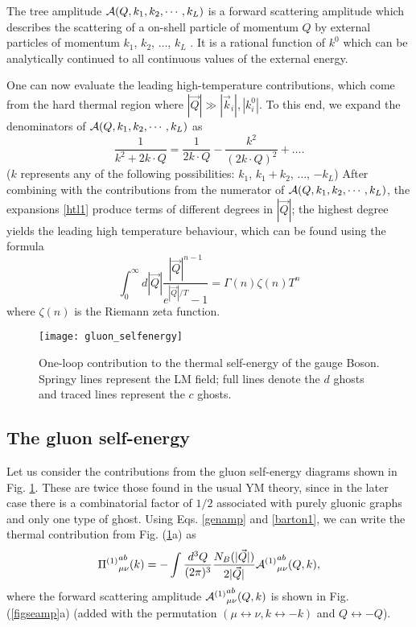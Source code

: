 \documentclass[longbibliography,groupedaddress,showpacs,showkeys,amssymb,eqsecnum,aps,nofootinbib,superscriptaddress]{revtex4}
\newcommand{\be}{\begin{equation}}
\newcommand{\ee}{\end{equation}}
\begin{document}
The tree amplitude ${\cal A}(Q,k_1,k_2,\cdots,k_L)$ is a forward 
scattering amplitude which describes the scattering of a
on-shell particle of momentum $Q$ by external particles of momentum
$k_1$, $k_2$, $\dots$, $k_L$ \cite{Barton:1990fk}. It is
a rational function of $k^0$
which can be analytically continued to all continuous values of the
external energy.

One can now evaluate the leading  high-temperature contributions,  
which come from the hard thermal region where 
$|\vec Q|\gg |\vec k_i|,|k^0_i|$. To this end,  we expand the
denominators of ${\cal A}(Q,k_1,k_2,\cdots,k_L)$ as
\be\label{htl1}
\frac{1}{k^2 + 2 k\cdot Q} = \frac{1}{2 k\cdot Q} 
- \frac{k^2}{(2 k\cdot Q) ^2} + \dots  .
\ee
($k$ represents any of the following possibilities: $k_1$, $k_1+k_2$,
$\dots$, $-k_L$)
After combining with the contributions
from the numerator of ${\cal A}(Q,k_1,k_2,\cdots,k_L)$, the expansions
\eqref{htl1} produce terms of different degrees in $|\vec Q|$; the highest degree
yields the leading high temperature behaviour, which can be found
using the formula
\be\label{htl2}
\int_0^\infty d |\vec Q| \frac{|\vec Q|^{n-1}}{e^{|\vec Q|/T}-1} =
\Gamma(n) \zeta(n) T^n 
\ee
where $\zeta(n)$ is the Riemann zeta function.

\begin{figure}[t]
    \texttt{[image: gluon\_selfenergy]}
    \caption{One-loop contribution to the thermal self-energy of the 
      gauge Boson. Springy lines represent the LM field; full lines 
      denote the $d$ ghosts and traced lines represent the $c$ ghosts.}\label{figse}
\end{figure}

\subsection{The gluon self-energy}
Let us consider the contributions from the gluon self-energy diagrams 
shown in Fig. \ref{figse}. These are twice those found in the usual YM theory, 
since in the later case there is a combinatorial factor of $1/2$
associated with purely gluonic graphs and only one type of ghost.  
Using Eqs.  \eqref{genamp} and \eqref{barton1},  
we can write the thermal contribution from Fig. (\ref{figse}a) as 
\be 
{\Pi^{(1)}}^{ab}_{\mu\nu}(k) = - \int \frac{d^3 Q}{(2\pi)^3}
\frac{N_B(|\vec Q|)}{2|\vec Q|} 
{{\cal A}^{(1)}}^{ab}_{\mu\nu}(Q,k)
,
\ee
where the forward scattering amplitude ${{\cal A}^{(1)}}^{ab}_{\mu\nu}(Q,k)$ is
shown in Fig. (\ref{figseamp}a) (added with the permutation $(\mu\leftrightarrow\nu,k\leftrightarrow-k)$ and $Q \leftrightarrow -Q$).
\end{document}

